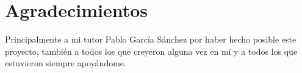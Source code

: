 %
%

\chapter*{Agradecimientos}

Principalmente a mi tutor Pablo García Sánchez por haber hecho posible este proyecto, también a todos los que creyeron alguna vez en mí y a todos los que estuvieron siempre apoyándome.
